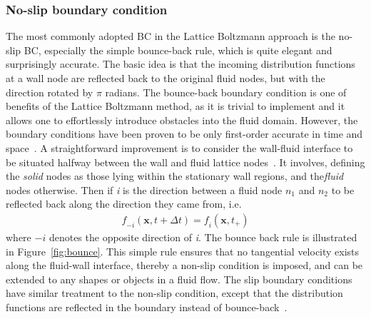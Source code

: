 \subsubsection*{No-slip boundary condition} \label{bounce}
The most commonly adopted BC in the Lattice Boltzmann approach is the no-slip BC, especially the simple bounce-back rule, which is quite elegant and surprisingly accurate. The basic idea is that the incoming distribution functions at a wall node are reflected back to the original fluid nodes, but with the direction rotated by $\pi$ radians. The bounce-back boundary condition is one of benefits of the Lattice Boltzmann method, as it is trivial to implement and it allows one to effortlessly introduce obstacles into the fluid domain. However, the boundary conditions have been proven to be only first-order accurate in time and space~\citep{pan2006}. A straightforward improvement is to consider the wall-fluid interface to be situated halfway between the wall and fluid lattice nodes~\citep{ziegler1993}. It involves, defining the \textit{solid} nodes as those lying within the stationary wall regions, and the\textit{fluid} nodes otherwise. Then if \textit{i} is the direction between a fluid node $\textit{n}_{1}$ and $\textit{n}_{2}$ to be reflected back along the direction they came from, i.e.
\begin{align}
\textit{f}_{-\textit{i}}(\mathbf{x}, \textit{t}+\Delta \textit{t}) = \textit{f}_{\textit{i}}(\mathbf{x}, \textit{t}_{+})
\end{align}
where $-\textit{i}$ denotes the opposite direction of \textit{i}. The bounce back rule is illustrated in Figure~\ref{fig:bounce}. This simple rule ensures that no tangential velocity exists along the fluid-wall interface, thereby a non-slip condition is imposed, and can be extended to any shapes or objects in a fluid flow. The slip boundary conditions have similar treatment to the non-slip condition, except that the distribution functions are reflected in the boundary instead of bounce-back~\citep{succi2001}.
